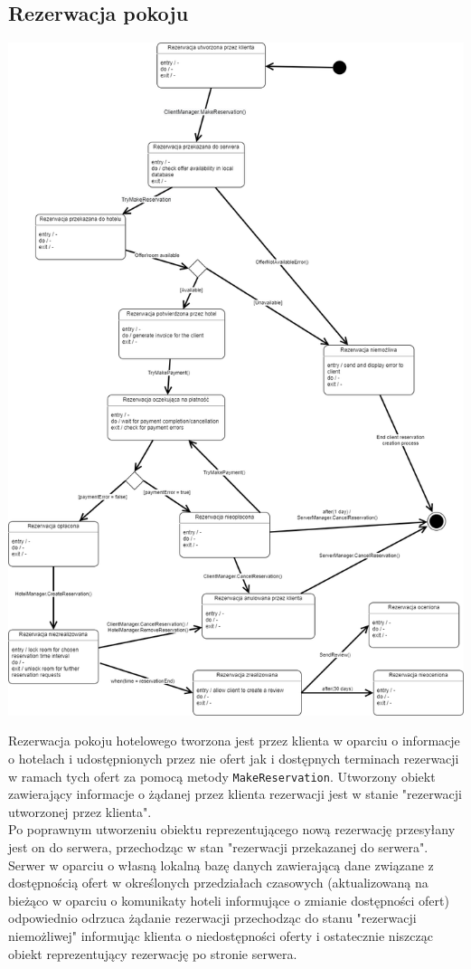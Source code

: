 \documentclass{article}
\begin{document}
\subsection{Rezerwacja pokoju}
\begin{center}
    \includegraphics[scale=0.42]{checkpoint1/ReservationStateDiagram.png}
\end{center}
\indent \indent Rezerwacja pokoju hotelowego tworzona jest przez klienta w oparciu o informacje o hotelach i udostępnionych przez nie ofert jak i dostępnych terminach rezerwacji w ramach tych ofert za pomocą metody \texttt{MakeReservation}. Utworzony obiekt zawierający informacje o żądanej przez klienta rezerwacji jest w stanie "rezerwacji utworzonej przez klienta".\\
\indent Po poprawnym utworzeniu obiektu reprezentującego nową rezerwację przesyłany jest on do serwera, przechodząc w stan "rezerwacji przekazanej do serwera". Serwer w oparciu o własną lokalną bazę danych zawierającą dane związane z dostępnością ofert w określonych przedziałach czasowych (aktualizowaną na bieżąco w oparciu o komunikaty hoteli informujące o zmianie dostępności ofert) odpowiednio odrzuca żądanie rezerwacji przechodząc do stanu "rezerwacji niemożliwej" informując klienta o niedostępności oferty i ostatecznie niszcząc obiekt reprezentujący rezerwację po stronie serwera.\\
\end{document}
